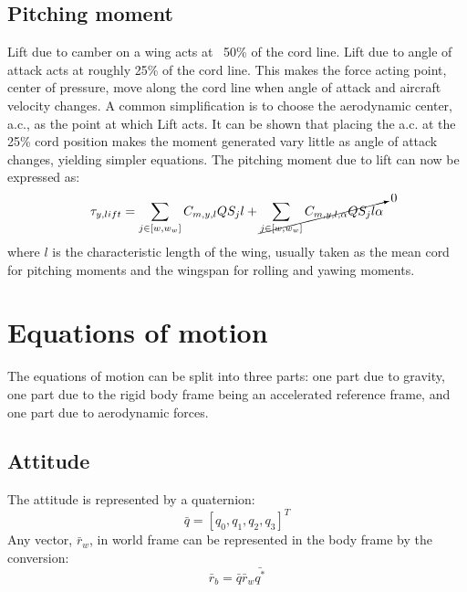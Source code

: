 \subsection{Pitching moment}
Lift due to camber on a wing acts at ~50\% of the cord line.
Lift due to angle of attack acts at roughly 25\% of the cord line.
This makes the force acting point, center of pressure, move along the cord line when angle of attack and aircraft velocity changes.
A common simplification is to choose the aerodynamic center, a.c., as the point at which Lift acts.
It can be shown that placing the a.c. at the 25\% cord position 
makes the moment generated vary little as angle of attack changes, yielding simpler equations.
The pitching moment due to lift can now be expressed as:
\begin{equation}
    \tau_{y,lift} = \sum_{j \in [w, w_w]}
    C_{m,y,l} Q S_j l +  \cancelto{0}{\sum_{j \in [w, w_w]}
    C_{m,y,l,\alpha} Q S_j l \alpha}
\end{equation}
where $l$ is the characteristic length of the wing, usually taken as the mean cord for pitching moments and the wingspan for rolling and yawing moments.

\section{Equations of motion}

The equations of motion can be split into three parts: one part due to gravity, one part due to the rigid body frame being an accelerated reference frame, and one part due to aerodynamic forces.

\subsection{Attitude}
The attitude is represented by a quaternion:
\begin{equation}
\bar{q} = [q_0, q_1, q_2, q_3]^T
\end{equation}
Any vector, $\bar{r}_w$, in world frame can be represented in the body frame by the conversion:
\begin{equation}
    \bar{r}_b = \bar{q} \bar{r}_w \bar{q^*}
\end{equation}
